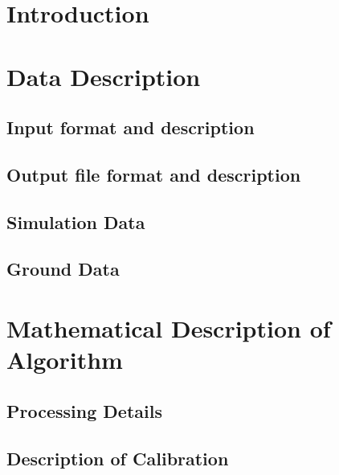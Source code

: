 \documentclass[MS]{spherex}
\begin{document}
\maketitle

\begin{dochistory}
\end{dochistory}


\section{Introduction}

\section{Data Description}

\subsection{Input format and description}

\subsection{Output file format and description}

\subsection{Simulation Data}

\subsection{Ground Data}

\section{Mathematical Description of Algorithm}

\subsection{Processing Details}

\subsection{Description of Calibration}
\end{document}
